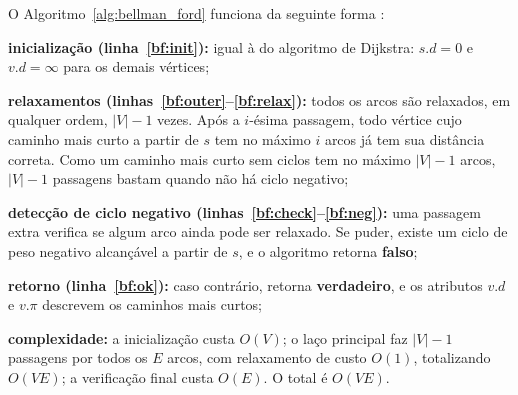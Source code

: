 \begin{algorithm}[H]
    \DontPrintSemicolon
    \SetAlgoLined

    \caption{Algoritmo de Bellman-Ford \cite{cormen}}
    \label{alg:bellman_ford}
\end{algorithm}

O Algoritmo~\ref{alg:bellman_ford} funciona da seguinte forma \cite{cormen}:

\begin{alineas}
    \item \textbf{inicialização (linha~\ref{bf:init}):} igual à do algoritmo de Dijkstra: $s.d = 0$ e $v.d = \infty$ para os demais vértices;
    \item \textbf{relaxamentos (linhas~\ref{bf:outer}--\ref{bf:relax}):} todos os arcos são relaxados, em qualquer ordem, $|V|-1$ vezes. Após a $i$-ésima passagem, todo vértice cujo caminho mais curto a partir de $s$ tem no máximo $i$ arcos já tem sua distância correta. Como um caminho mais curto sem ciclos tem no máximo $|V|-1$ arcos, $|V|-1$ passagens bastam quando não há ciclo negativo;
    \item \textbf{detecção de ciclo negativo (linhas~\ref{bf:check}--\ref{bf:neg}):} uma passagem extra verifica se algum arco ainda pode ser relaxado. Se puder, existe um ciclo de peso negativo alcançável a partir de $s$, e o algoritmo retorna \textbf{falso};
    \item \textbf{retorno (linha~\ref{bf:ok}):} caso contrário, retorna \textbf{verdadeiro}, e os atributos $v.d$ e $v.\pi$ descrevem os caminhos mais curtos;
    \item \textbf{complexidade:} a inicialização custa $O(V)$; o laço principal faz $|V|-1$ passagens por todos os $E$ arcos, com relaxamento de custo $O(1)$, totalizando $O(VE)$; a verificação final custa $O(E)$. O total é $O(VE)$.
\end{alineas}



